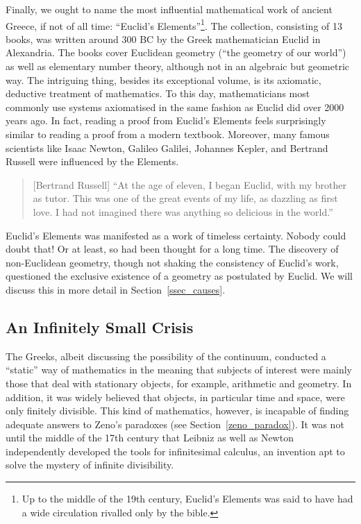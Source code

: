 \documentclass{article}
\begin{document}
Finally, we ought to name the most influential mathematical work of ancient Greece, if not of all time: ``Euclid's Elements''\footnote{Up to the middle of the 19th century, Euclid's Elements was said to have had a wide circulation rivalled only by the bible.}. 
The collection, consisting of 13 books, was written around 300 BC by the Greek mathematician Euclid in Alexandria. The books cover Euclidean geometry (``the geometry of our world'') as well as elementary number theory, although not in an algebraic but geometric way. The intriguing thing, besides its exceptional volume, is its axiomatic, deductive treatment of mathematics. To this day, mathematicians most commonly use systems axiomatised in the same fashion as Euclid did over 2000 years ago. In fact, reading a proof from Euclid's Elements feels surprisingly similar to reading a proof from a modern textbook. Moreover, many famous scientists like Isaac Newton, Galileo Galilei, Johannes Kepler, and Bertrand Russell were influenced by the Elements.
\begin{quote}[Bertrand Russell]
	``At the age of eleven, I began Euclid, with my brother as tutor. This was one of the great events of my life, as dazzling as first love. I had not imagined there was anything so delicious in the world.''\cite{russell_autobiography}
\end{quote}
Euclid's Elements was manifested as a work of timeless certainty. Nobody could doubt that! Or at least, so had been thought for a long time. The discovery of non-Euclidean geometry, though not shaking the consistency of Euclid's work, questioned the exclusive existence of a geometry as postulated by Euclid. We will discuss this in more detail in Section~\ref{ssec_causes}.

\subsection{An Infinitely Small Crisis}
The Greeks, albeit discussing the possibility of the continuum, conducted a ``static'' way of mathematics in the meaning that subjects of interest were mainly those that deal with stationary objects, for example, arithmetic and geometry. In addition, it was widely believed that objects, in particular time and space, were only finitely divisible. This kind of mathematics, however, is incapable of finding adequate answers to Zeno's paradoxes (see Section~\ref{zeno_paradox}).
It was not until the middle of the 17th century that Leibniz as well as Newton independently developed the tools for infinitesimal calculus, an invention apt to solve the mystery of infinite divisibility.
\end{document}
